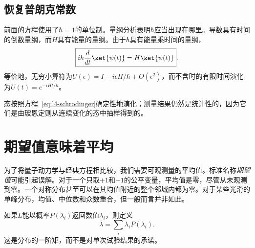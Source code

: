 \subsection{恢复普朗克常数}

前面的方程使用了\(\hbar=1\)的单位制。量纲分析表明\(\hbar\)应当出现在哪里。导数具有时间的倒数量纲，而\(H\)具有能量的量纲。由于\(\hbar\)具有能量乘时间的量纲，
\begin{equation}
\boxed{i\hbar\frac{d}{dt}\ket{\psi(t)}=H\ket{\psi(t)}}.
\label{eq:l4-schrodinger}
\end{equation}
等价地，无穷小算符为\(U(\epsilon)=I-i\epsilon H/\hbar+O(\epsilon^2)\)，而不含时的有限时间演化为\(U(t)=e^{-iHt/\hbar}\)。

\begin{classroomqa}
\end{classroomqa}

态按照方程~\eqref{eq:l4-schrodinger}确定性地演化；测量结果仍然是统计性的，因为它们是由玻恩定则从连续变化的态中抽样得到的。

\begin{classroomqa}
\end{classroomqa}

\section{期望值意味着平均}

为了将量子动力学与经典方程相比较，我们需要可观测量的平均值。标准名称\emph{期望值}可能引起误解。对于一个只取\(+1\)和\(-1\)的公平变量，平均值是零，尽管从未观测到零。一个对称分布甚至可以在其均值附近的整个邻域内都为零。对于某些光滑的单峰分布，均值、中位数和众数重合，但一般而言并非如此。

如果\(L\)能以概率\(P(\lambda_i)\)返回数值\(\lambda_i\)，则定义
\begin{equation}
\overline{\lambda}=\sum_i\lambda_iP(\lambda_i).
\label{eq:l4-probability-average}
\end{equation}
这是分布的一阶矩，而不是对单次试验结果的承诺。

